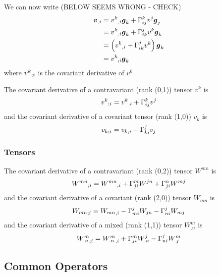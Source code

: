 We can now write (BELOW SEEMS WRONG - CHECK)
\begin{equation}
  \begin{split}
    \partialderiv{\vect{v}}{i}&=\partialderiv{v^{k}}{i}\vect{g}_{k}+\christoffel{k}{i}{j}v^{j}\vect{g}_{j}\\
    &=\partialderiv{v^{k}}{i}\vect{g}_{k}+\christoffel{j}{i}{k}v^{k}\vect{g}_{k}\\
    &=\pbrac{\partialderiv{v^{k}}{i}+\christoffel{j}{i}{k}v^{k}}\vect{g}_{k}\\
    &=\covarderiv{v^{k}}{i}\vect{g}_{k}
  \end{split}
\end{equation}
where $ {v^{k}}_{;i} $ is the covariant derivative of $v^{k}$ . 

The covariant derivative of a contravariant (rank (0,1)) tensor $v^{k}$ is
\begin{equation}
   {v^{k}}_{;i}  = {v^{k}}_{,i} + \Gamma^{k}_{ij} v^{j}
\end{equation}
and the covariant derivative of a covariant tensor  (rank (1,0)) $v_{k}$ is
\begin{equation}
   {v_{k}}_{;i}  = {v_{k}}_{,i} - \Gamma^{j}_{ki} v_{j}
\end{equation}

\subsubsection{Tensors}

The covariant derivative of a contravariant (rank (0,2)) tensor $W^{mn}$ is
\begin{equation}
   {W^{mn}}_{;i} = {W^{mn}}_{,i} + \Gamma^{m}_{ji} W^{jn}+ \Gamma^{n}_{ji} W^{mj}
\end{equation}
and the covariant derivative of a covariant (rank (2,0)) tensor $W_{mn}$ is
\begin{equation}
   {W_{mn}}_{;i} = {W_{mn}}_{,i} - \Gamma^{j}_{mi} W_{jn}- \Gamma^{j}_{ni} W_{mj}
\end{equation}
and the covariant derivative of a mixed (rank (1,1)) tensor $W^{m}_{.n}$ is
\begin{equation}
   {W^{m}_{.n}}_{;i} = {W^{m}_{.n}}_{,i} + \Gamma^{m}_{ji} W^{j}_{.n}- \Gamma^{j}_{ni} W^{m}_{.j}
\end{equation}

\subsection{Common Operators}

